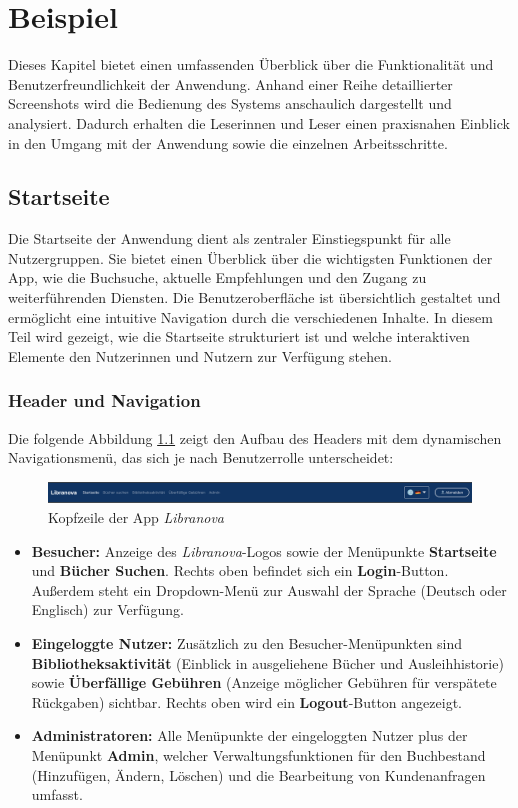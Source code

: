 \chapter{Beispiel}
Dieses Kapitel bietet einen umfassenden Überblick über die Funktionalität und Benutzerfreundlichkeit der Anwendung. Anhand einer Reihe detaillierter Screenshots wird die Bedienung des Systems anschaulich dargestellt und analysiert. Dadurch erhalten die Leserinnen und Leser einen praxisnahen Einblick in den Umgang mit der Anwendung sowie die einzelnen Arbeitsschritte.

\section{Startseite}

Die Startseite der Anwendung dient als zentraler Einstiegspunkt für alle Nutzergruppen. Sie bietet einen Überblick über die wichtigsten Funktionen der App, wie die Buchsuche, aktuelle Empfehlungen und den Zugang zu weiterführenden Diensten. Die Benutzeroberfläche ist übersichtlich gestaltet und ermöglicht eine intuitive Navigation durch die verschiedenen Inhalte. In diesem Teil wird gezeigt, wie die Startseite strukturiert ist und welche interaktiven Elemente den Nutzerinnen und Nutzern zur Verfügung stehen.

\subsection{Header und Navigation}
Die folgende Abbildung \ref{fig:header} zeigt den Aufbau des Headers mit dem dynamischen Navigationsmenü, das sich je nach Benutzerrolle unterscheidet:

\begin{figure}[H]
	\centering
	\includegraphics[width=1.0\textwidth]{images/UI-screenshots/Header.png}
	\caption{ Kopfzeile der App \textit{Libranova}}
	\label{fig:header}
\end{figure}

\begin{itemize}
	\item \textbf{Besucher:} Anzeige des \textit{Libranova}-Logos sowie der Menüpunkte \textbf{Startseite} und \textbf{Bücher Suchen}. Rechts oben befindet sich ein \textbf{Login}-Button. Außerdem steht ein Dropdown-Menü zur Auswahl der Sprache (Deutsch oder Englisch) zur Verfügung.
	\item \textbf{Eingeloggte Nutzer:} Zusätzlich zu den Besucher-Menüpunkten sind \textbf{Bibliotheksaktivität} (Einblick in ausgeliehene Bücher und Ausleihhistorie) sowie \textbf{Überfällige Gebühren} (Anzeige möglicher Gebühren für verspätete Rückgaben) sichtbar. Rechts oben wird ein \textbf{Logout}-Button angezeigt. 
	\item \textbf{Administratoren:} Alle Menüpunkte der eingeloggten Nutzer plus der Menüpunkt \textbf{Admin}, welcher Verwaltungsfunktionen für den Buchbestand (Hinzufügen, Ändern, Löschen) und die Bearbeitung von Kundenanfragen umfasst.
\end{itemize}

